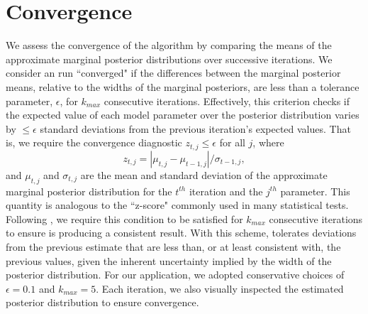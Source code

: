 
\section{Convergence} \label{AP:sec:app:convergence}

We assess the convergence of the \approxposterior algorithm by comparing the means of the approximate marginal posterior distributions over successive iterations. We consider an \approxposterior run ``converged" if the differences between the marginal posterior means, relative to the widths of the marginal posteriors, are less than a tolerance parameter, $\epsilon$, for $k_{max}$ consecutive iterations. Effectively, this criterion checks if the expected value of each model parameter over the posterior distribution varies by ${\leq}{\epsilon}$ standard deviations from the previous iteration's expected values. That is, we require the \approxposterior convergence diagnostic $z_{t,j}{\leq}{\epsilon}$ for all $j$, where
\begin{equation}
    z_{t,j} = |\mu_{t,j} - \mu_{t-1,j}| / \sigma_{t-1,j},
\end{equation}
 and $\mu_{t,j}$ and $\sigma_{t,j}$ are the mean and standard deviation of the approximate marginal posterior distribution for the $t^{th}$ iteration and the $j^{th}$ parameter. This quantity is analogous to the ``z-score" commonly used in many statistical tests. Following \citet{Wang2018}, we require this condition to be satisfied for $k_{max}$ consecutive iterations to ensure \approxposterior is producing a consistent result. With this scheme, \approxposterior tolerates deviations from the previous estimate that are less than, or at least consistent with, the previous values, given the inherent uncertainty implied by the width of the posterior distribution. For our application, we adopted conservative choices of $\epsilon = 0.1$ and $k_{max} = 5$. Each \approxposterior iteration, we also visually inspected the estimated posterior distribution to ensure convergence. 

